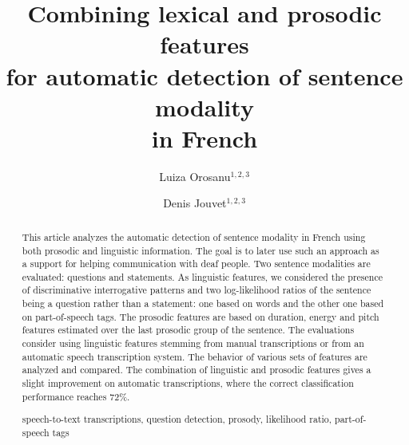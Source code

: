 \documentclass[runningheads,a4paper]{llncs}
\newcommand{\keywords}[1]{\par\addvspace\baselineskip
\noindent\keywordname\enspace\ignorespaces#1}
\begin{document}
\mainmatter  %

\title{Combining lexical and prosodic features\\for automatic detection of sentence modality\\ in French}

\author{Luiza Orosanu$^{1,2,3}$ \and Denis Jouvet$^{1,2,3}$%
}




\toctitle{}
\tocauthor{}
\maketitle


\begin{abstract}
This article analyzes the automatic detection of sentence modality in French using both prosodic and linguistic information.
The goal is to later use such an approach as a support for helping communication with deaf people.
Two sentence modalities are evaluated: questions and statements.
As linguistic features, we considered the presence of discriminative interrogative patterns and two log-likelihood ratios of the sentence being a question rather than a statement: one based on words and the other one based on part-of-speech tags.
The prosodic features are based on duration, energy and pitch features estimated over the last prosodic group of the sentence.
The evaluations consider using linguistic features stemming from manual transcriptions or from an automatic speech transcription system.
The behavior of various sets of features are analyzed and compared.
The combination of linguistic and prosodic features gives a slight improvement on automatic transcriptions, where the correct classification performance reaches 72\%.
\keywords{speech-to-text transcriptions, question detection, prosody, likelihood ratio, part-of-speech tags}
\end{abstract}
\end{document}
